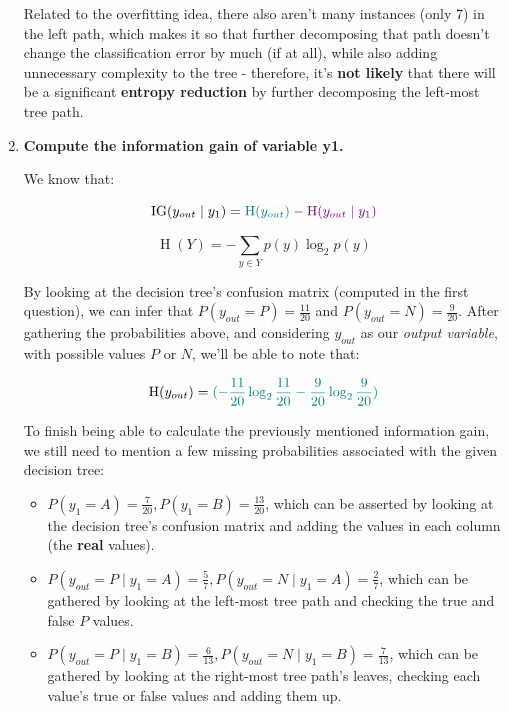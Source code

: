 \documentclass[12pt]{article}
\begin{document}
\begin{enumerate}[leftmargin=\labelsep]
Related to the overfitting idea, there also aren't many instances (only 7) in the
left path, which makes it so that further decomposing that path doesn't change
the classification error by much (if at all), while also adding unnecessary
complexity to the tree - therefore, it's \textbf{not likely} that there will be a significant
\textbf{entropy reduction} by further decomposing the left-most tree path.

\item \textbf{Compute the information gain of variable y1.}

We know that:

\begin{equation}
  \operatorname{IG}(y_{out} \mid y_1) = \textcolor{teal}{\operatorname{H}(y_{out})} - \textcolor{violet}{\operatorname{H}(y_{out} \mid y_1)}
\end{equation}

\begin{equation}
  \operatorname{H}(Y) = -\sum_{y \in Y} p(y) \log_2 p(y)
\end{equation}

By looking at the decision tree's confusion matrix (computed in the first question),
we can infer that $P(y_{out} = P) = \frac{11}{20}$ and $P(y_{out} = N) = \frac{9}{20}$.
After gathering the probabilities above, and considering $y_{out}$ as our \textit{output variable}, with possible values $P$ or $N$,
we'll be able to note that:

\begin{equation}
  \operatorname{H}(y_{out}) = \textcolor{teal}{(- \frac{11}{20} \log_2 \frac{11}{20} - \frac{9}{20} \log_2 \frac{9}{20})}
\end{equation}

To finish being able to calculate the previously mentioned information gain, we still
need to mention a few missing probabilities associated with the given decision tree:

\begin{itemize}
  \item $P(y_1 = A) = \frac{7}{20}, P(y_1 = B) = \frac{13}{20}$,
  which can be asserted by looking at the decision tree's confusion matrix
  and adding the values in each column (the \textbf{real} values).
  \item $P(y_{out} = P \mid y_1 = A) = \frac{5}{7}, P(y_{out} = N \mid y_1 = A) = \frac{2}{7}$,
  which can be gathered by looking at the left-most tree path and checking the true
  and false $P$ values.
  \item $P(y_{out} = P \mid y_1 = B) = \frac{6}{13}, P(y_{out} = N \mid y_1 = B) = \frac{7}{13}$,
  which can be gathered by looking at the right-most tree path's leaves,
  checking each value's true or false values and adding them up.
\end{itemize}


\end{enumerate}
\end{document}
